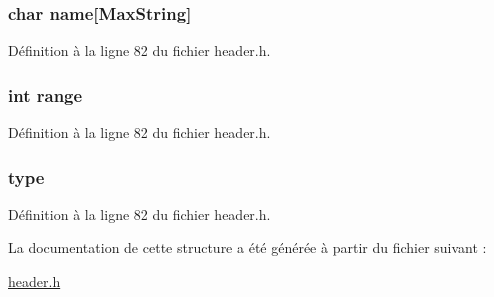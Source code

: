 \hypertarget{structt__skill_ab27f28c5ead39031421706ddbbd1edea}{
\subsubsection[{name}]{\setlength{\rightskip}{0pt plus 5cm}char name\mbox{[}{\bf Max\-String}\mbox{]}}}\label{structt__skill_ab27f28c5ead39031421706ddbbd1edea}


Définition à la ligne 82 du fichier header.\-h.

\hypertarget{structt__skill_a037e8e370380046bec287bdc96942091}{
\subsubsection[{range}]{\setlength{\rightskip}{0pt plus 5cm}int range}}\label{structt__skill_a037e8e370380046bec287bdc96942091}


Définition à la ligne 82 du fichier header.\-h.

\hypertarget{structt__skill_ac00edc3c188c78c47878a357ecff2954}{
\subsubsection[{type}]{ type}}\label{structt__skill_ac00edc3c188c78c47878a357ecff2954}


Définition à la ligne 82 du fichier header.\-h.



La documentation de cette structure a été générée à partir du fichier suivant \-:\begin{DoxyCompactItemize}
\item 
\hyperlink{header_8h}{header.\-h}\end{DoxyCompactItemize}

